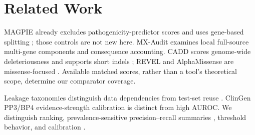 \section{Related Work}

MAGPIE already excludes pathogenicity-predictor scores and uses gene-based splitting \cite{liu2024magpie,shen2024correction}; those controls are not new here. MX-Audit examines local full-source multi-gene components and consequence accounting. CADD scores genome-wide deleteriousness and supports short indels \cite{rentzsch2019cadd}; REVEL and AlphaMissense are missense-focused \cite{ioannidis2016revel,cheng2023alphamissense}. Available matched scores, rather than a tool's theoretical scope, determine our comparator coverage.

Leakage taxonomies distinguish data dependencies from test-set reuse \cite{kapoor2023leakage}. ClinGen PP3/BP4 evidence-strength calibration \cite{pejaver2022calibration} is distinct from high AUROC. We distinguish ranking, prevalence-sensitive precision--recall summaries \cite{saito2015pr}, threshold behavior, and calibration \cite{guo2017calibration}.
